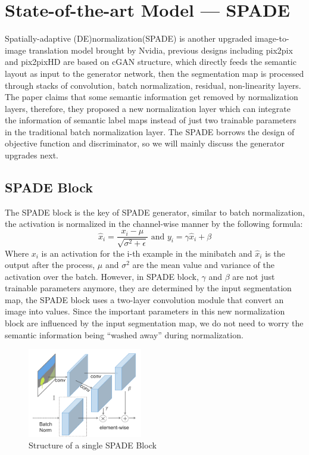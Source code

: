 \section{State-of-the-art Model — SPADE}
Spatially-adaptive (DE)normalization(SPADE) \cite{park2019SPADE} is another upgraded image-to-image 
translation model brought by Nvidia, previous designs including pix2pix \cite{pix2pix2016} and 
pix2pixHD \cite{wang2018pix2pixHD} are based on cGAN structure, which directly feeds the semantic 
layout as input to the generator network, then the segmentation map is processed through stacks 
of convolution, batch normalization, residual, non-linearity layers. The paper claims that 
some semantic information get removed by normalization layers, therefore, they proposed a new 
normalization layer which can integrate the information of semantic label maps instead of just 
two trainable parameters in the traditional batch normalization layer. The SPADE borrows the design 
of objective function and discriminator, so we will mainly discuss the generator upgrades next. 
\subsection{SPADE Block}
The SPADE block is the key of SPADE generator, similar to batch normalization, the activation is 
normalized in the channel-wise manner by the following formula:
$$\hat{x}_{i}=\frac{x_{i}-\mu}{\sqrt{\sigma^{2}+\epsilon}} \text { and } y_{i}=\gamma \hat{x}_{i}+\beta$$
Where $x_{i}$ is an activation for the i-th example in the minibatch and $\hat{x}_{i}$ is the output after 
the process, $\mu$ and $\sigma^{2}$ are the mean value and variance of the activation over the batch.
However, in SPADE block, $\gamma$ and $\beta$ are not just 
trainable parameters anymore, they are determined by the input segmentation map, the SPADE block uses
a two-layer convolution module that convert an image into values. Since the important parameters in
this new normalization block are influenced by the input segmentation map, we do not need to worry 
the semantic information being “washed away” during normalization.
\begin{figure}[H]
    \begin{center}
    \includegraphics[width=5cm]{figures/SPADE-Block}
    \end{center}
    \caption{Structure of a single SPADE Block}
    \label{fig:SPADE-Block}
\end{figure}

